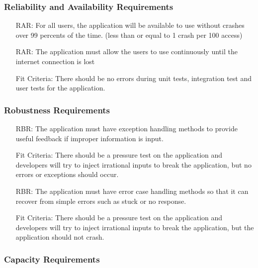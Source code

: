 \documentclass[12pt]{article}
\newcounter{reqnum} %
\newcounter{arreqnum} %
\newcounter{rarreqnum} %
\newcounter{rbrreqnum} %
\newcounter{ccrreqnum} %
\newcounter{crreqnum} %
\begin{document}
\subsubsection{Reliability and Availability Requirements}
\begin{itemize}
    \item[RAR\refstepcounter{rarreqnum}\therarreqnum \label{R_Inputs}:] For all users, the application will be available to use without crashes over 99 percents of the time. (less than or equal to 1 crash per 100 access)
    \item[RAR\refstepcounter{rarreqnum}\therarreqnum \label{R_Inputs}:] The application must allow the users to use continuously until the internet connection is lost
    \item[] Fit Criteria: There should be no errors during unit tests, integration test and user tests for the application.
\end{itemize}

\subsubsection{Robustness Requirements}
\begin{itemize}
    \item[RBR\refstepcounter{rbrreqnum}\therbrreqnum \label{R_Inputs}:] The application must have exception handling methods to provide useful feedback if improper information is input.
    \item[] Fit Criteria: There should be a pressure test on the application and developers will try to inject irrational inputs to break the application, but no errors or exceptions should occur.
    \item[RBR\refstepcounter{rbrreqnum}\therbrreqnum \label{R_Inputs}:] The application must have error case handling methods so that it can recover from simple errors such as stuck or no response.
    \item[] Fit Criteria: There should be a pressure test on the application and developers will try to inject irrational inputs to break the application, but the application should not crash.
\end{itemize}

\subsubsection{Capacity Requirements}
\end{document}
